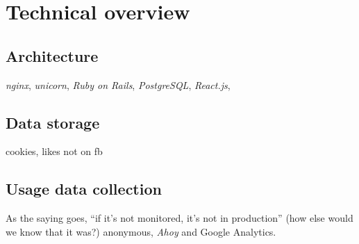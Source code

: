 
\chapter{Technical overview}

\section{Architecture}

\emph{nginx}, \emph{unicorn}, \emph{Ruby on Rails}, \emph{PostgreSQL}, \emph{React.js}, 

\section{Data storage}

cookies, likes not on fb

\section{Usage data collection}

As the saying goes, ``if it's not monitored, it's not in production'' \cite{monitored} (how else would we know that it was?) anonymous, \emph{Ahoy} and Google Analytics.